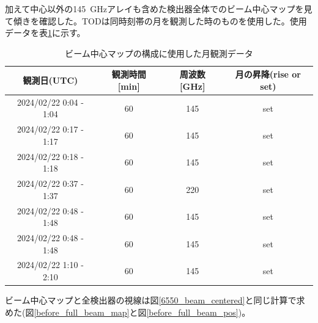 加えて中心以外の\SI{145}{GHz}アレイも含めた検出器全体でのビーム中心マップを見て傾きを確認した。TODは同時刻帯の月を観測した時のものを使用した。使用データを表\ref{before_full_array_table}に示す。
\begin{table}[htbp]
  \centering
  \caption{ビーム中心マップの構成に使用した月観測データ}
  \vspace{3mm}
  \begin{tabular}{cccc} \hline
    観測日(UTC) & 観測時間 [min] & 周波数 [GHz] & 月の昇降(rise or set) \\ \hline
    2024/02/22 0:04 - 1:04 & 60 & 145 & set \\
    2024/02/22 0:17 - 1:17 & 60 & 145 & set \\
    2024/02/22 0:18 - 1:18 & 60 & 145 & set \\
    2024/02/22 0:37 - 1:37 & 60 & 220 & set \\
    2024/02/22 0:48 - 1:48 & 60 & 145 & set \\
    2024/02/22 0:48 - 1:48 & 60 & 145 & set \\
    2024/02/22 1:10 - 2:10 & 60 & 145 & set \\ \hline

  \end{tabular}
  \label{before_full_array_table}
\end{table}
ビーム中心マップと全検出器の視線は図\ref{6550_beam_centered}と同じ計算で求めた(図\ref{before_full_beam_map}と図\ref{before_full_beam_pos})。
